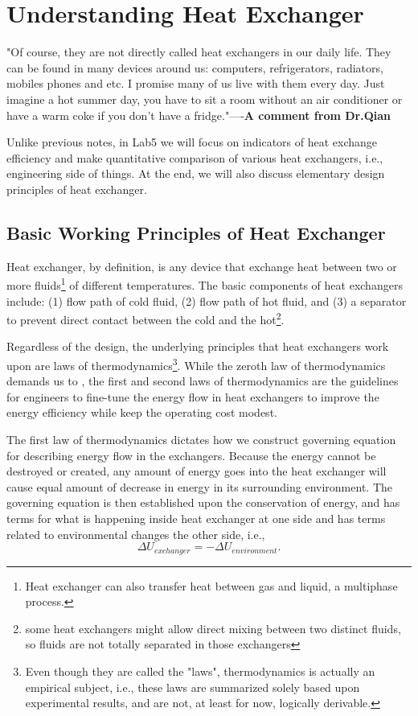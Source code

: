 \chapter{Understanding Heat Exchanger}
\begin{docspec}
	"Of course, they are not directly called heat exchangers in our daily life. They can be found in many devices around us: computers, refrigerators, radiators, mobiles phones and etc. I promise many of us live with them every day. Just imagine a hot summer day, you have to sit a room without an air conditioner or have a warm coke if you don't have a fridge."----\textbf{A comment from Dr.Qian}
\end{docspec}
Unlike previous notes, in Lab5 we will focus on indicators of heat exchange efficiency and make quantitative comparison of various heat exchangers, i.e., engineering side of things. At the end, we will also discuss elementary design principles of heat exchanger.

\section{Basic Working Principles of Heat Exchanger}
Heat exchanger, by definition, is any device that exchange heat between two or more fluids\footnote{Heat exchanger can also transfer heat between gas and liquid, a multiphase process.} of different temperatures.  The basic components of heat exchangers include: (1) flow path of cold fluid, (2) flow path of hot fluid, and (3) a separator to prevent direct contact between the cold and the hot\footnote{some heat exchangers might allow direct mixing between two distinct fluids, so fluids are not totally separated in those exchangers}.

Regardless of the design, the underlying principles that heat exchangers work upon are laws of thermodynamics\footnote{Even though they are called the "laws", thermodynamics is actually an empirical subject, i.e., these laws are summarized solely based upon experimental results, and are not, at least for now, logically derivable.}. While the zeroth law of thermodynamics demands us to , the first and second laws of thermodynamics are the guidelines for engineers to fine-tune the energy flow in heat exchangers to improve the energy efficiency while keep the operating cost modest.  

The first law of thermodynamics dictates how we construct governing equation for describing energy flow in the exchangers. Because the energy cannot be destroyed or created, any amount of energy goes into the heat exchanger will cause equal amount of decrease in energy in its surrounding environment. The governing equation is then established upon the conservation of energy, and has terms for what is happening inside heat exchanger at one side and has terms related to environmental changes the other side, i.e.,
\begin{equation}
	\Delta U_{exchanger} = -\Delta U_{environment}.
\end{equation}

